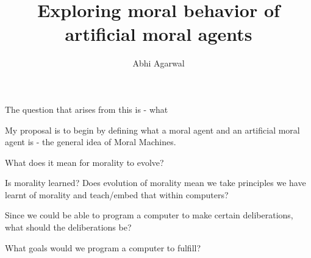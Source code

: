 \documentclass[11pt, oneside]{article}
\title{Exploring moral behavior of artificial moral agents}
\author{Abhi Agarwal}
\date{}
\begin{document}
\maketitle

\par The question that arises from this is - what 

\par My proposal is to begin by defining what a moral agent and an artificial moral agent is - the general idea of Moral Machines.
\par What does it mean for morality to evolve?
\par Is morality learned? Does evolution of morality mean we take principles we have learnt of morality and teach/embed that within computers?
\par Since we could be able to program a computer to make certain deliberations, what should the deliberations be?
\par What goals would we program a computer to fulfill?
\end{document}
